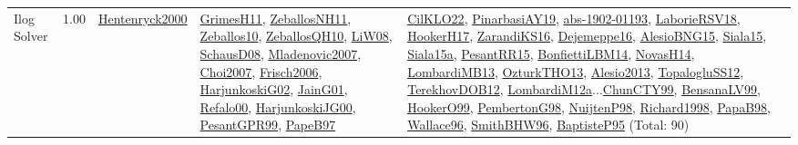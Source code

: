 {\begin{longtable}{p{3cm}r>{\raggedright\arraybackslash}p{6cm}>{\raggedright\arraybackslash}p{6cm}>{\raggedright\arraybackslash}p{8cm}}
\index{Ilog Solver}\index{CPSystems!Ilog Solver}Ilog Solver &  1.00 & \hyperref[detail:Hentenryck2000]{Hentenryck2000} & \hyperref[detail:GrimesH11]{GrimesH11}, \hyperref[detail:ZeballosNH11]{ZeballosNH11}, \hyperref[detail:Zeballos10]{Zeballos10}, \hyperref[detail:ZeballosQH10]{ZeballosQH10}, \hyperref[detail:LiW08]{LiW08}, \hyperref[detail:SchausD08]{SchausD08}, \hyperref[detail:Mladenovic2007]{Mladenovic2007}, \hyperref[detail:Choi2007]{Choi2007}, \hyperref[detail:Frisch2006]{Frisch2006}, \hyperref[detail:HarjunkoskiG02]{HarjunkoskiG02}, \hyperref[detail:JainG01]{JainG01}, \hyperref[detail:Refalo00]{Refalo00}, \hyperref[detail:HarjunkoskiJG00]{HarjunkoskiJG00}, \hyperref[detail:PesantGPR99]{PesantGPR99}, \hyperref[detail:PapeB97]{PapeB97} & \hyperref[detail:CilKLO22]{CilKLO22}, \hyperref[detail:PinarbasiAY19]{PinarbasiAY19}, \hyperref[detail:abs-1902-01193]{abs-1902-01193}, \hyperref[detail:LaborieRSV18]{LaborieRSV18}, \hyperref[detail:HookerH17]{HookerH17}, \hyperref[detail:ZarandiKS16]{ZarandiKS16}, \hyperref[detail:Dejemeppe16]{Dejemeppe16}, \hyperref[detail:AlesioBNG15]{AlesioBNG15}, \hyperref[detail:Siala15]{Siala15}, \hyperref[detail:Siala15a]{Siala15a}, \hyperref[detail:PesantRR15]{PesantRR15}, \hyperref[detail:BonfiettiLBM14]{BonfiettiLBM14}, \hyperref[detail:NovasH14]{NovasH14}, \hyperref[detail:LombardiMB13]{LombardiMB13}, \hyperref[detail:OzturkTHO13]{OzturkTHO13}, \hyperref[detail:Alesio2013]{Alesio2013}, \hyperref[detail:TopalogluSS12]{TopalogluSS12}, \hyperref[detail:TerekhovDOB12]{TerekhovDOB12}, \hyperref[detail:LombardiM12a]{LombardiM12a}...\hyperref[detail:ChunCTY99]{ChunCTY99}, \hyperref[detail:BensanaLV99]{BensanaLV99}, \hyperref[detail:HookerO99]{HookerO99}, \hyperref[detail:PembertonG98]{PembertonG98}, \hyperref[detail:NuijtenP98]{NuijtenP98}, \hyperref[detail:Richard1998]{Richard1998}, \hyperref[detail:PapaB98]{PapaB98}, \hyperref[detail:Wallace96]{Wallace96}, \hyperref[detail:SmithBHW96]{SmithBHW96}, \hyperref[detail:BaptisteP95]{BaptisteP95} (Total: 90)\\

\end{longtable}}
